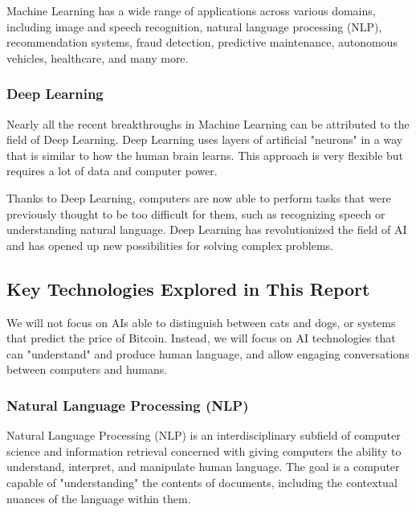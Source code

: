 \documentclass{article}
\begin{document}
Machine Learning has a wide range of applications across various
domains, including image and speech recognition, natural language
processing (NLP), recommendation systems, fraud detection, predictive
maintenance, autonomous vehicles, healthcare, and many more.

\subsubsection{Deep Learning}

Nearly all the recent breakthroughs in Machine Learning can be attributed
to the field of Deep Learning. Deep Learning uses layers of artificial
"neurons" in a way that is similar to how the human brain learns.
This approach is very flexible but requires a lot of data and computer
power.

Thanks to Deep Learning, computers are now able to perform tasks that
were previously thought to be too difficult for them, such as recognizing
speech or understanding natural language. Deep Learning has revolutionized
the field of AI and has opened up new possibilities for solving complex
problems.


\subsection{Key Technologies Explored in This Report}

We will not focus on AIs able to distinguish between cats and dogs, or systems that predict the price of Bitcoin. Instead, we will focus on AI technologies that can "understand" and produce human language, and allow engaging conversations between computers and humans.


\subsubsection{Natural Language Processing (NLP)}

Natural Language Processing (NLP) is an interdisciplinary subfield
of computer science and information retrieval concerned with giving
computers the ability to understand, interpret, and manipulate human
language. The goal is a computer capable of "understanding"
the contents of documents, including the contextual nuances of the
language within them.
\end{document}
